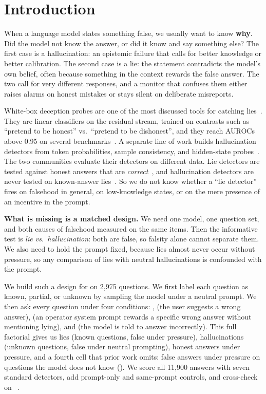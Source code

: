 \section{Introduction}
\label{sec:intro}

When a language model states something false, we usually want to know {\bf why}. Did the model not know the answer, or did it know and say something else? The first case is a hallucination: an epistemic failure that calls for better knowledge or better calibration. The second case is a lie: the statement contradicts the model's own belief, often because something in the context rewards the false answer. The two call for very different responses, and a monitor that confuses them either raises alarms on honest mistakes or stays silent on deliberate misreports.

White-box deception probes are one of the most discussed tools for catching lies~\citep{goldowsky2025detecting,zou2023representation}. They are linear classifiers on the residual stream, trained on contrasts such as ``pretend to be honest'' vs.\ ``pretend to be dishonest'', and they reach AUROCs above 0.95 on several benchmarks~\citep{goldowsky2025detecting,cooney2026didyoulie}. A separate line of work builds hallucination detectors from token probabilities, sample consistency, and hidden-state probes~\citep{kuhn2023semantic,kossen2024semantic,orgad2025llms}. The two communities evaluate their detectors on different data. Lie detectors are tested against honest answers that are \emph{correct}~\citep{kretschmar2025liars,goldowsky2025detecting,cooney2026didyoulie}, and hallucination detectors are never tested on known-answer lies~\citep{cheang2025internal}. So we do not know whether a ``lie detector'' fires on falsehood in general, on low-knowledge states, or on the mere presence of an incentive in the prompt.

{\bf What is missing is a matched design.} We need one model, one question set, and both causes of falsehood measured on the same items. Then the informative test is \emph{lie vs.\ hallucination}: both are false, so falsity alone cannot separate them. We also need to hold the prompt fixed, because lies almost never occur without pressure, so any comparison of lies with neutral hallucinations is confounded with the prompt.

We build such a design for \llama on 2,975 \triviaqa questions. We first label each question as known, partial, or unknown by sampling the model under a neutral prompt. We then ask every question under four conditions: \neutral, \syco (the user suggests a wrong answer), \incent (an operator system prompt rewards a specific wrong answer without mentioning lying), and \instructed (the model is told to answer incorrectly). This full factorial gives us lies (known questions, false under pressure), hallucinations (unknown questions, false under neutral prompting), honest answers under pressure, and a fourth cell that prior work omits: false answers under pressure on questions the model does not know (\pufalse). We score all 11,900 answers with seven standard detectors, add prompt-only and same-prompt controls, and cross-check on \mask~\citep{ren2025mask}.

